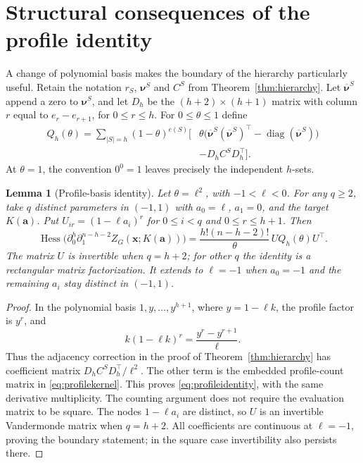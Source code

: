 \documentclass[11pt]{article}
\newtheorem{lemma}[theorem]{Lemma}
\theoremstyle{remark}
\DeclareMathOperator{\Hess}{Hess}
\DeclareMathOperator{\diag}{diag}
\newcommand{\bnu}{\boldsymbol{\nu}}
\newcommand{\dd}{\partial}
\begin{document}
\section{Structural consequences of the profile identity}
A change of polynomial basis makes the boundary of the hierarchy
particularly useful. Retain the notation $r_S$, $\bnu^S$ and $C^S$
from Theorem~\ref{thm:hierarchy}. Let $\overline{\bnu}^S$ append a
zero to $\bnu^S$, and let $D_h$ be the $(h+2)\times(h+1)$ matrix
with column $r$ equal to $e_r-e_{r+1}$, for $0\leq r\leq h$.
For $0\leq\theta\leq1$ define
\begin{equation}
\begin{split}
 Q_h(\theta)=\sum_{|S|=h}(1-\theta)^{e(S)}
 \bigl[&\theta\bigl(\overline{\bnu}^S(\overline{\bnu}^S)^\top
                -\diag(\overline{\bnu}^S)\bigr)\\
       &-D_h C^S D_h^\top\bigr].
\end{split}                                               \label{eq:profilekernel}
\end{equation}
At $\theta=1$, the convention $0^0=1$ leaves precisely the
independent $h$-sets.

\begin{lemma}[Profile-basis identity]\label{lem:profile}
Let $\theta=\ell^2$, with $-1<\ell<0$. For any $q\geq2$,
take $q$ distinct parameters in $(-1,1)$ with $a_0=\ell$, $a_1=0$,
and the target $K(\mathbf a)$. Put $U_{ir}=(1-\ell a_i)^r$ for
$0\leq i<q$ and $0\leq r\leq h+1$. Then
\begin{equation}
 \Hess\bigl(\dd_0^h\dd_1^{n-h-2}Z_G(\mathbf x;K(\mathbf a))\bigr)
  =\frac{h!(n-h-2)!}{\theta}\,UQ_h(\theta)U^\top.       \label{eq:profileidentity}
\end{equation}
The matrix $U$ is invertible when $q=h+2$; for other $q$ the
identity is a rectangular matrix factorization. It extends to $\ell=-1$
when $a_0=-1$ and the remaining $a_i$ stay distinct in $(-1,1)$.
\end{lemma}
\begin{proof}
In the polynomial basis $1,y,\ldots,y^{h+1}$, where
$y=1-\ell k$, the profile factor is $y^r$, and
\[
 k(1-\ell k)^r=\frac{y^r-y^{r+1}}{\ell}.
\]
Thus the adjacency correction in the proof of
Theorem~\ref{thm:hierarchy} has coefficient matrix
$D_hC^SD_h^\top/\ell^2$. The other term is the embedded profile-count
matrix in \eqref{eq:profilekernel}. This proves
\eqref{eq:profileidentity}, with the same derivative multiplicity.
The counting argument does not require the evaluation matrix to
be square. The nodes $1-\ell a_i$ are distinct, so $U$ is an
invertible Vandermonde matrix when $q=h+2$. All coefficients are
continuous at $\ell=-1$, proving the boundary statement; in the
square case invertibility also persists there.
\end{proof}
\end{document}
